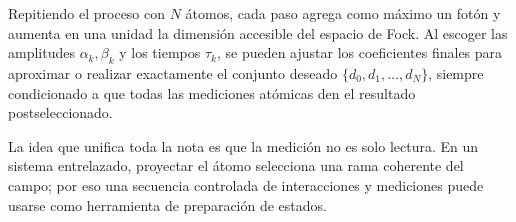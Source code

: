 \documentclass[11pt]{article}
\begin{document}
Repitiendo el proceso con $N$ \'atomos, cada paso agrega como m\'aximo un
fot\'on y aumenta en una unidad la dimensi\'on accesible del espacio de Fock.
Al escoger las amplitudes $\alpha_k,\beta_k$ y los tiempos $\tau_k$, se pueden
ajustar los coeficientes finales para aproximar o realizar exactamente el
conjunto deseado $\{d_0,d_1,\ldots,d_N\}$, siempre condicionado a que todas las
mediciones at\'omicas den el resultado postseleccionado.

\bigskip

La idea que unifica toda la nota es que la medici\'on no es solo lectura. En
un sistema entrelazado, proyectar el \'atomo selecciona una rama coherente del
campo; por eso una secuencia controlada de interacciones y mediciones puede
usarse como herramienta de preparaci\'on de estados.
\end{document}
